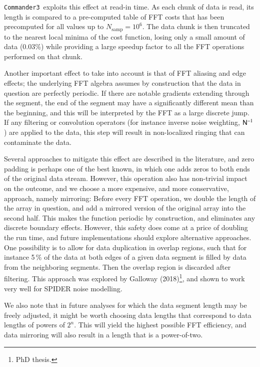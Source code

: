 \documentclass[twocolumn]{aa}
\def\commanderthree{\texttt{Commander3}}
\newcommand{\N}[0]{\tens{N}}
\begin{document}
\commanderthree\ exploits this effect at read-in time. As each chunk
of data is read, its length is compared to a pre-computed table of FFT
costs that has been precomputed for all values up to
$N_{\mathrm{samp}} = 10^6$. The data chunk is then truncated to the
nearest local minima of the cost function, losing only a small amount
of data (0.03\%) while providing a large speedup factor to all the FFT
operations performed on that chunk.

Another important effect to take into account is that of FFT aliasing
and edge effects; the underlying FFT algebra assumes by construction
that the data in question are perfectly periodic. If there are notable
gradients extending through the segment, the end of the segment may
have a significantly different mean than the beginning, and this will
be interpreted by the FFT as a large discrete jump. If any filtering
or convolution operators (for instance inverse noise weighting,
$\N^{-1}$) are applied to the data, this step will result in
non-localized ringing that can contaminate the data.

Several approaches to mitigate this effect are described in the
literature, and zero padding is perhaps one of the best known, in
which one adds zeros to both ends of the original data
stream. However, this operation also has non-trivial impact on the
outcome, and we choose a more expensive, and more conservative,
approach, namely mirroring: Before every FFT operation, we double the
length of the array in question, and add a mirrored version of the
original array into the second half. This makes the function periodic
by construction, and eliminates any discrete boundary
effects. However, this safety does come at a price of doubling the run
time, and future implementations should explore alternative
approaches. One possibility is to allow for data duplication in
overlap regions, such that for instance 5\,\% of the data at both
edges of a given data segment is filled by data from the neighboring
segments. Then the overlap region is discarded after filtering. This
approach was explored by Galloway (2018)\footnote{PhD thesis.}, and
shown to work very well for SPIDER noise modelling. 

We also note that in future analyses for which the data segment length
may be freely adjusted, it might be worth choosing data lengths that
correspond to data lengths of powers of $2^n$. This will
yield the highest possible FFT efficiency, and data mirroring will
also result in a length that is a power-of-two.
\end{document}
